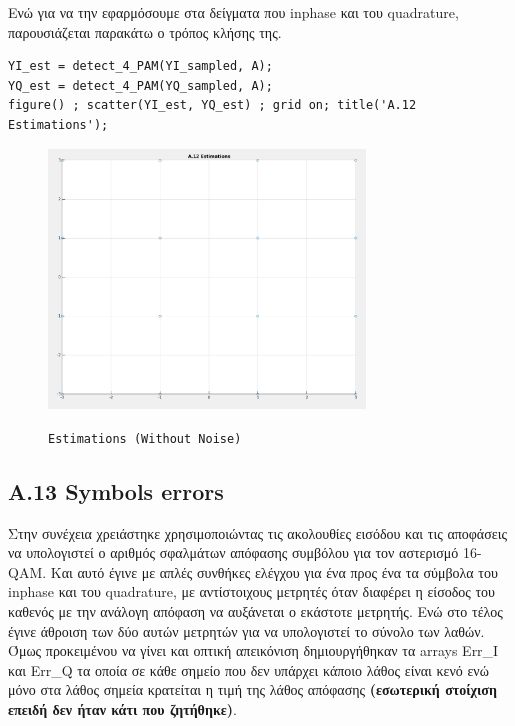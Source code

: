 \documentclass[11pt]{article}
\begin{document}
    \par \noindent
    Ενώ για να την εφαρμόσουμε στα δείγματα που inphase και του quadrature, παρουσιάζεται παρακάτω ο τρόπος κλήσης της.
    
    \begin{lstlisting}[caption = {A.12 \texttt{Setect Symbols}}]
% A.12
YI_est = detect_4_PAM(YI_sampled, A); 
YQ_est = detect_4_PAM(YQ_sampled, A); 
figure() ; scatter(YI_est, YQ_est) ; grid on; title('A.12 Estimations');
    \end{lstlisting}
    
    \begin{figure}[H]
        \centering
        \includegraphics[scale=0.5, width=0.75\textwidth]{img/A12_without_noise.png} \\
        \caption{\texttt{Estimations (Without Noise)}}
    \end{figure}
    
    \subsection*{A.13 Symbols errors}
    Στην συνέχεια χρειάστηκε χρησιμοποιώντας τις ακολουθίες εισόδου και τις αποφάσεις να υπολογιστεί ο αριθμός σφαλμάτων απόφασης συμβόλου για τον αστερισμό 16-QAM.
    Και αυτό έγινε με απλές συνθήκες ελέγχου για ένα προς ένα τα σύμβολα του inphase και του quadrature, με αντίστοιχους μετρητές όταν διαφέρει η είσοδος του καθενός με την ανάλογη απόφαση να αυξάνεται ο εκάστοτε μετρητής. 
    Ενώ στο τέλος έγινε άθροιση των δύο αυτών μετρητών για να υπολογιστεί το σύνολο των λαθών. 
    Όμως προκειμένου να γίνει και οπτική απεικόνιση δημιουργήθηκαν τα arrays Err\_I και Err\_Q τα οποία σε κάθε σημείο που δεν υπάρχει κάποιο λάθος είναι κενό ενώ μόνο στα λάθος σημεία κρατείται η τιμή της λάθος απόφασης \textbf{(εσωτερική στοίχιση επειδή δεν ήταν κάτι που ζητήθηκε)}.
    
\end{document}
